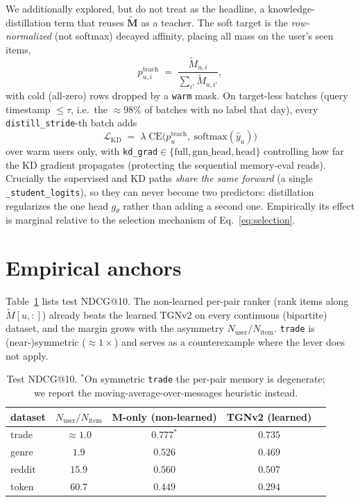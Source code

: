 \documentclass[11pt]{article}
\begin{document}
We additionally explored, but do not treat as the headline, a knowledge-distillation term that reuses $\tilde{\mathbf M}$ as a teacher. The soft target is the \emph{row-normalized} (not softmax) decayed affinity, placing all mass on the user's seen items,
\begin{equation}
p^{\text{teach}}_{u,i} \;=\; \frac{\tilde M_{u,i}}{\sum_{i'} \tilde M_{u,i'}},
\end{equation}
with cold (all-zero) rows dropped by a \texttt{warm} mask. On target-less batches (query timestamp $\le \tau$, i.e.\ the $\approx\!98\%$ of batches with no label that day), every \texttt{distill\_stride}-th batch adds
\begin{equation}
\mathcal{L}_{\text{KD}} \;=\; \lambda\; \mathrm{CE}\!\big(p^{\text{teach}}_u,\ \mathrm{softmax}(\hat y_u)\big)
\end{equation}
over warm users only, with \texttt{kd\_grad}$\in\{\text{full},\text{gnn\_head},\text{head}\}$ controlling how far the KD gradient propagates (protecting the sequential memory-eval reads). Crucially the supervised and KD paths \emph{share the same forward} (a single \texttt{\_student\_logits}), so they can never become two predictors: distillation regularizes the one head $g_\theta$ rather than adding a second one. Empirically its effect is marginal relative to the selection mechanism of Eq.~\eqref{eq:selection}.

\section{Empirical anchors}
\label{sec:anchors}
Table~\ref{tab:anchors} lists test NDCG@10. The non-learned per-pair ranker
(rank items along $\tilde M[u,:]$) already beats the learned TGNv2 on every
continuous (bipartite) dataset, and the margin grows with the asymmetry
$N_{\text{user}}/N_{\text{item}}$. \texttt{trade} is (near-)symmetric
($\approx\!1\times$) and serves as a counterexample where the lever does not apply.
\begin{table}[h]
\centering
\begin{tabular}{lcccc}
\toprule
dataset & $N_{\text{user}}/N_{\text{item}}$ & M-only (non-learned) & TGNv2 (learned) \\
\midrule
trade  & $\approx\!1.0$ & $0.777^{*}$ & $0.735$ \\
genre  & $1.9$          & $0.526$     & $0.469$ \\
reddit & $15.9$         & $0.560$     & $0.507$ \\
token  & $60.7$         & $0.449$     & $0.294$ \\
\bottomrule
\end{tabular}
\caption{Test NDCG@10. $^{*}$On symmetric \texttt{trade} the per-pair memory is
degenerate; we report the moving-average-over-messages heuristic instead.}
\label{tab:anchors}
\end{table}
\end{document}

